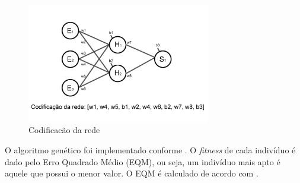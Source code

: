 \documentclass[12pt]{article}
\begin{document}
\begin{figure}[ht]
\centering
\includegraphics[width=80mm]{codificacao.png}
\caption{Codificacão da rede}
\label{fig:nn}
\end{figure}

\par O algoritmo genético foi implementado conforme \cite{essentials}. O \textit{fitness} de cada indivíduo é dado pelo Erro Quadrado Médio (EQM), ou seja, um indivíduo mais apto é aquele que possui o menor valor. O EQM é calculado de acordo com \cite{Liu}.
\end{document}
